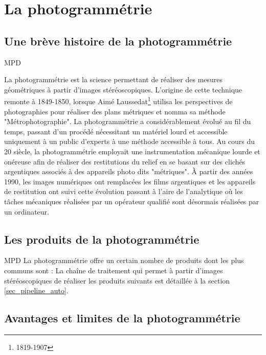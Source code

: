 \section{La photogrammétrie} 
\subsection{Une brève histoire de la photogrammétrie}
MPD

La photogrammétrie est la science permettant de réaliser des mesures géométriques à partir d'images stéréoscopiques. L'origine de cette technique remonte à 1849-1850, lorsque Aimé Laussedat\footnote{1819-1907} utilisa les perspectives de photographies pour réaliser des plans métriques et nomma sa méthode  "Métrophotographie". La photogrammétrie a considérablement évolué au fil du temps, passant d'un procédé nécessitant un matériel lourd et accessible uniquement à un public d'experts à une méthode accessible à tous. Au cours du 20 siècle, la photogrammétrie employait une instrumentation mécanique lourde et onéreuse afin de réaliser des restitutions du relief en se basant sur des clichés argentiques associés à des appareils photo dits "métriques". À partir des années 1990, les images numériques ont remplacées les films argentiques et les appareils de restitution ont suivi cette évolution passant à l'aire de l'analytique où les tâches mécaniques réalisées par un opérateur qualifié sont désormais réalisées par un ordinateur.

\subsection{Les produits de la photogrammétrie}
MPD
La photogrammétrie offre un certain nombre de produits dont les plus communs sont : La chaîne de traitement qui permet à partir d'images stéréoscopiques de réaliser les produits suivants est détaillée à la section \ref{sec_pipeline_auto}.
\subsection{Avantages et limites de la photogrammétrie}